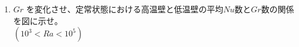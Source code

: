 \begin{enumerate}
\begin{figure}[htb]
\begin{center}
{    }
    \caption{50ステップ毎の温度分布・速度ベクトルの様子}
    \label{im1}
    \end{center}
  \end{figure}
  図\ref{im1}より、ステップ数が増加すると高温の空気と低温の空気の混合が進展することが分かる。ステップ数が350程度になると、温度分布が一定になる。
  速度ベクトルの大きさは、ステップ数が増加するごとに大きくなり、温度分布が一定になると減少傾向になる。
  \item $Gr$ を変化させ、定常状態における高温壁と低温壁の平均$Nu$数と$Gr$数の関係を図に示せ。\\$(10^3 < Ra < 10^5)$\\

\end{enumerate}
